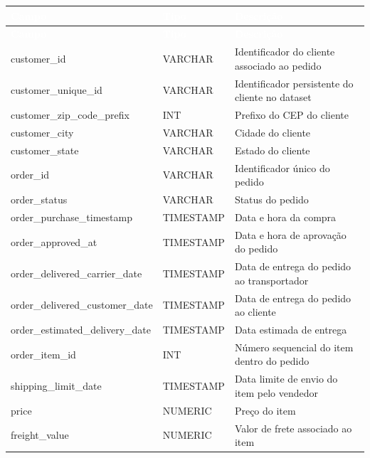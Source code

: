 \documentclass[12pt,a4paper]{article}
\begin{document}
{\footnotesize
\begin{longtable}{
    |>{\raggedright\arraybackslash}p{5.5cm}
    |>{\raggedright\arraybackslash}p{2cm}
    |>{\raggedright\arraybackslash}p{6.8cm}|
}
\hline
\rowcolor{AzulCorporativo}
\textcolor{white}{\textbf{Campo}} &
\textcolor{white}{\textbf{Tipo}} &
\textcolor{white}{\textbf{Descrição}} \\ \hline
\endfirsthead

\hline
\rowcolor{AzulCorporativo}
\textcolor{white}{\textbf{Campo}} &
\textcolor{white}{\textbf{Tipo}} &
\textcolor{white}{\textbf{Descrição}} \\ \hline
\endhead

customer\_id & VARCHAR & Identificador do cliente associado ao pedido \\
customer\_unique\_id & VARCHAR & Identificador persistente do cliente no dataset \\
customer\_zip\_code\_prefix & INT & Prefixo do CEP do cliente \\
customer\_city & VARCHAR & Cidade do cliente \\
customer\_state & VARCHAR & Estado do cliente \\

order\_id & VARCHAR & Identificador único do pedido \\
order\_status & VARCHAR & Status do pedido \\
order\_purchase\_timestamp & TIMESTAMP & Data e hora da compra \\
order\_approved\_at & TIMESTAMP & Data e hora de aprovação do pedido \\
order\_delivered\_carrier\_date & TIMESTAMP & Data de entrega do pedido ao transportador \\
order\_delivered\_customer\_date & TIMESTAMP & Data de entrega do pedido ao cliente \\
order\_estimated\_delivery\_date & TIMESTAMP & Data estimada de entrega \\

order\_item\_id & INT & Número sequencial do item dentro do pedido \\
shipping\_limit\_date & TIMESTAMP & Data limite de envio do item pelo vendedor \\
price & NUMERIC & Preço do item \\
freight\_value & NUMERIC & Valor de frete associado ao item \\


\end{longtable}}
\end{document}
